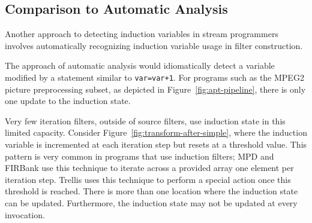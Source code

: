 \subsection{Comparison to Automatic Analysis}

Another approach to detecting induction variables in 
stream programmers involves automatically
recognizing induction variable usage in filter construction. 

The approach of automatic analysis would idiomatically detect 
a variable modified by a statement similar to \texttt{var=var+1}. For programs
such as the MPEG2 picture preprocessing subset, as depicted in Figure~\ref{fig:apt-pipeline},
there is only one update to the induction state.

Very few iteration filters, outside of source filters, use induction state 
in this limited capacity. Consider Figure~\ref{fig:transform-after-simple}, where
the induction variable is incremented at each iteration step but resets at 
a threshold value. This pattern is very common in programs that use
induction filters; MPD and FIRBank use this technique to iterate
across a provided array one element per iteration step.  Trellis uses this
technique to perform a special action once this threshold is reached.
There is more than one location where the induction state can be updated.
Furthermore, the induction state may not be updated at every invocation.







